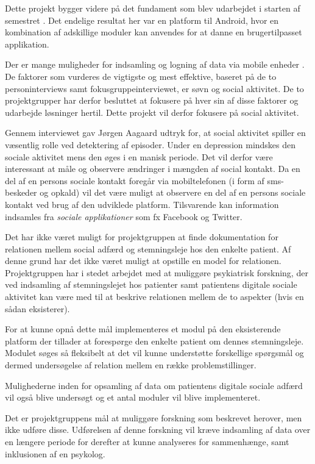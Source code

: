Dette projekt bygger videre på det fundament som blev udarbejdet i starten af semestret \citefaelles{}.
Det endelige resultat her var en platform til Android, hvor en kombination af adskillige moduler kan anvendes for at danne en brugertilpasset applikation.

Der er mange muligheder  for indsamling og logning af data via mobile enheder .
De faktorer som vurderes de vigtigste og mest effektive, baseret på de to personinterviews samt fokusgruppeinterviewet, er søvn og social aktivitet.
De to projektgrupper har derfor besluttet at fokusere på hver sin af disse faktorer og udarbejde løsninger hertil.
Dette projekt vil derfor fokusere på social aktivitet.

Gennem interviewet gav Jørgen Aagaard udtryk for, at social aktivitet spiller en væsentlig rolle ved detektering af episoder.
Under en depression mindskes den sociale aktivitet mens den øges i en manisk periode.
Det vil derfor være interessant at måle og observere ændringer i mængden af social kontakt.
Da en del af en persons sociale kontakt foregår via mobiltelefonen (i form af sms-beskeder og opkald) vil det være muligt at observere en del af en persons sociale kontakt ved brug af den udviklede platform.
Tilsvarende kan information indsamles fra \textit{sociale applikationer} som fx Facebook og Twitter.

Det har ikke været muligt for projektgruppen at finde dokumentation for relationen mellem social adfærd og stemningsleje hos den enkelte patient.
Af denne grund har det ikke været muligt at opstille en model for relationen.
Projektgruppen har i stedet arbejdet med at muliggøre psykiatrisk forskning, der ved indsamling af stemningslejet hos patienter samt patientens digitale sociale aktivitet kan være med til at beskrive relationen mellem de to aspekter (hvis en sådan eksisterer).

For at kunne opnå dette mål implementeres et modul på den eksisterende platform \citefaelles{} der tillader at forespørge den enkelte patient om dennes stemningsleje.
Modulet søges så fleksibelt at det vil kunne understøtte forskellige spørgsmål og dermed undersøgelse af relation mellem en række problemstillinger.

Mulighederne inden for opsamling af data om patientens digitale sociale adfærd vil også blive undersøgt og et antal moduler vil blive implementeret.

Det er projektgruppens mål at muliggøre forskning som beskrevet herover, men ikke udføre disse.
Udførelsen af denne forskning vil kræve indsamling af data over en længere periode for derefter at kunne analyseres for sammenhænge, samt inklusionen af en psykolog.